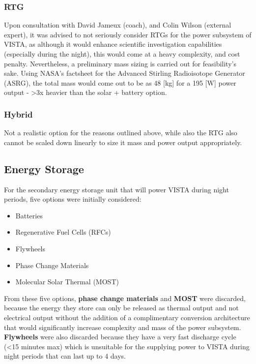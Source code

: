 \subsubsection{RTG}

Upon consultation with David Jameux (coach), and Colin Wilson (external expert), it was advised to not seriously consider RTGs for the power subsystem of VISTA, as although it would enhance scientific investigation capabilities (especially during the night), this would come at a heavy complexity, and cost penalty. Nevertheless, a preliminary mass sizing is carried out for feasibility's sake. Using NASA's factsheet for the Advanced Stirling Radioisotope Generator (ASRG), the total mass would come out to be  as 48 [kg] for a 195 [W] power output - >3x heavier than the solar + battery option.

\subsubsection{Hybrid}

Not a realistic option for the reasons outlined above, while also the RTG also cannot be scaled down linearly to size it mass and power output appropriately.

\subsection{Energy Storage}
\label{sub:energy-storage}

For the secondary energy storage unit that will power VISTA during night periods, five options were initially considered:

\begin{itemize}
    \item Batteries
    \item Regenerative Fuel Cells (RFCs)
    \item Flywheels
    \item Phase Change Materials
    \item Molecular Solar Thermal (MOST)
\end{itemize}

From these five options, \textbf{phase change materials} and \textbf{MOST} were discarded, because the energy they store can only be released as thermal output and not electrical output without the addition of a complimentary conversion architecture that would significantly increase complexity and mass of the power subsystem. \textbf{Flywheels} were also discarded because they have a very fast discharge cycle (<15 minutes max) which is unsuitable for the supplying power to VISTA during night periods that can last up to 4 days.

